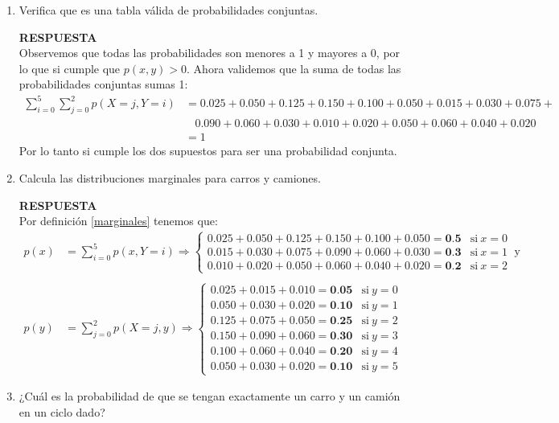 \documentclass[11pt,letterpaper]{article}
\newcommand{\res}{\textbf{RESPUESTA}\\}
\begin{document}
\begin{enumerate}
\item Verifica que es una tabla válida de probabilidades conjuntas.

\res Observemos que todas las probabilidades son menores a 1 y mayores a 0, por lo que si cumple que $p(x,y)>0.$ Ahora validemos que la suma de todas las probabilidades conjuntas sumas 1:
\begin{align*}
\sum_{i=0}^5 \sum_{j=0}^2 p(X=j,Y=i)&= 0.025+0.050+0.125+0.150+
0.100+0.050+0.015+0.030+0.075+\\
&\ \ \ \ 0.090+0.060+0.030+0.010+ 0.020+0.050+0.060+0.040+0.020\\
&=1
\end{align*}
Por lo tanto si cumple los dos supuestos para ser una probabilidad conjunta. 

\item Calcula las distribuciones marginales para carros y camiones.

\res Por definición \ref{marginales} tenemos que:
\begin{align*}
p(x)&= \sum_{i=0}^5 p(x,Y=i) \Rightarrow \left\{\begin{array}{cc}
0.025+0.050+0.125+0.150+
0.100+0.050=\textbf{0.5} & \text{si} \ x=0\\
0.015+0.030+0.075+0.090+0.060+0.030=\textbf{0.3} & \text{si} \ x=1\\
0.010+ 0.020+0.050+0.060+0.040+0.020= \textbf{0.2} & \text{si} \ x=2
\end{array} \right. \ \text{y} \\ \\
p(y)&= \sum_{j=0}^2 p(X=j,y) \Rightarrow \left\{\begin{array}{cc}
0.025+0.015+0.010=\textbf{0.05} & \text{si} \ y=0\\
0.050+0.030+0.020=\textbf{0.10} & \text{si} \ y=1\\
0.125+0.075+0.050= \textbf{0.25} & \text{si} \ y=2\\
0.150+0.090+0.060=\textbf{0.30} & \text{si} \ y=3\\
0.100+0.060+0.040=\textbf{0.20} & \text{si} \ y=4\\
0.050+0.030+0.020=\textbf{0.10} & \text{si} \ y=5
\end{array} \right.
\end{align*}

\item ¿Cuál es la probabilidad de que se tengan exactamente un carro y un camión en un ciclo dado?


\end{enumerate}
\end{document}
